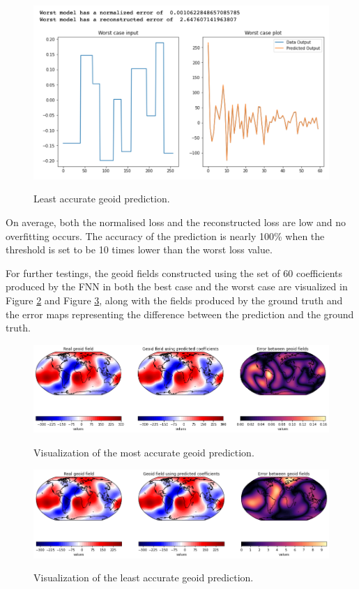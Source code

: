 \begin{figure}[H]
    \caption{Least accurate geoid prediction.}
    \includegraphics[scale=0.6]{figures/geoid_images/Geoid_Worst.png}
    \label{figure:geoid_worst}
\end{figure}

On average, both the normalised loss and the reconstructed loss are low and no overfitting occurs. The accuracy of the prediction is nearly 100\% when the threshold is set to be 10 times lower than the worst loss value. 

For further testings, the geoid fields constructed using the set of 60 coefficients produced by the FNN in both the best case and the worst case are visualized in Figure \ref{figure:geoid_best_visual} and Figure \ref{figure:geoid_worst_visual}, along with the fields produced by the ground truth and the error maps representing the difference between the prediction and the ground truth.

\begin{figure}[H]
    \caption{Visualization of the most accurate geoid prediction.}
    \includegraphics[scale=0.4]{figures/geoid_images/Geoid_Best_visualization.png}
    \label{figure:geoid_best_visual}
\end{figure}

\begin{figure}[H]
    \caption{Visualization of the least accurate geoid prediction.}
    \includegraphics[scale=0.4]{figures/geoid_images/Geoid_Worst_visualization.png}
    \label{figure:geoid_worst_visual}
\end{figure}


